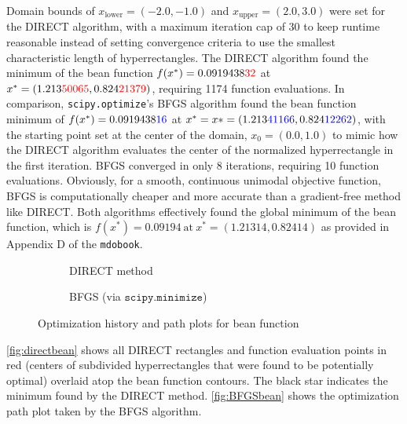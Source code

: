 \documentclass{article}
\begin{document}
Domain bounds of $x_\text{lower} = (-2.0, -1.0)$ and $x_\text{upper} = (2.0, 3.0)$ were set for the DIRECT algorithm, with a maximum iteration cap of 30 to keep runtime reasonable instead of setting convergence criteria to use the smallest characteristic length of hyperrectangles. The DIRECT algorithm found the minimum of the bean function $f(x^*) = 0.0919438\textcolor{red}{32}$ at $x^* = (1.213\textcolor{red}{50065}, 0.824\textcolor{red}{21379})$, requiring 1174 function evaluations. In comparison, \texttt{scipy.optimize}'s BFGS algorithm found the bean function minimum of $f(x^*) = 0.0919438\textcolor{blue}{16}$ at $x^* = x* = (1.213\textcolor{blue}{41166}, 0.824\textcolor{blue}{12262})$, with the starting point set at the center of the domain, $x_0 = (0.0, 1.0)$ to mimic how the DIRECT algorithm evaluates the center of the normalized hyperrectangle in the first iteration. BFGS converged in only 8 iterations, requiring 10 function evaluations. Obviously, for a smooth, continuous unimodal objective function, BFGS is computationally cheaper and more accurate than a gradient-free method like DIRECT. Both algorithms effectively found the global minimum of the bean function, which is $f(x^*) = 0.09194 \ \text{at} \ x^* = (1.21314, 0.82414)$ as provided in Appendix D of the \texttt{mdobook}. 

\begin{figure}[H]
\centering
    \begin{subfigure}{0.49\textwidth}
        \centering
        
        \caption{DIRECT method}
        \label{fig:directbean}
    \end{subfigure}
    \hfill
    \begin{subfigure}{0.49\textwidth}
        \centering
        
        \caption{BFGS (via $\texttt{scipy.minimize}$)}
        \label{fig:BFGSbean}
    \end{subfigure}
\caption{Optimization history and path plots for bean function}
\label{fig:beancomp}
\end{figure}

\autoref{fig:directbean} shows all DIRECT rectangles and function evaluation points in red (centers of subdivided hyperrectangles that were found to be potentially optimal) overlaid atop the bean function contours. The black star indicates the minimum found by the DIRECT method. \autoref{fig:BFGSbean} shows the optimization path plot taken by the BFGS algorithm. 
\end{document}
